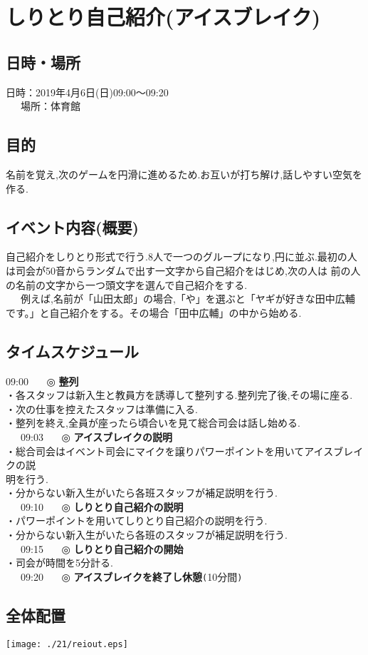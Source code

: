 \section{しりとり自己紹介(アイスブレイク)}
\subsection{日時・場所}
日時：2019年4月6日(日)09:00〜09:20\\
\ \ \ 場所：体育館\\
\subsection{目的}
名前を覚え,次のゲームを円滑に進めるため.お互いが打ち解け,話しやすい空気を作る.
\subsection{イベント内容(概要)}
自己紹介をしりとり形式で行う.8人で一つのグループになり,円に並ぶ.最初の人は司会が50音からランダムで出す一文字から自己紹介をはじめ,次の人は
前の人の名前の文字から一つ頭文字を選んで自己紹介をする.\\
\ \ \ 例えば,名前が「山田太郎」の場合,「や」を選ぶと「ヤギが好きな田中広輔です。」と自己紹介をする。その場合「田中広輔」の中から始める.
\subsection{タイムスケジュール}
09:00 \ \ \ ◎ \textbf{整列} \\
\hspace{15mm}・各スタッフは新入生と教員方を誘導して整列する.整列完了後,その場に座る.\\
\hspace{15mm}・次の仕事を控えたスタッフは準備に入る.\\
\hspace{15mm}・整列を終え,全員が座ったら頃合いを見て総合司会は話し始める.\\
\ \ \ 09:03 \ \ \ ◎ \textbf{アイスブレイクの説明}\\
\hspace{15mm}・総合司会はイベント司会にマイクを譲りパワーポイントを用いてアイスブレイクの説\\
\hspace{15mm}明を行う.\\
\hspace{15mm}・分からない新入生がいたら各班スタッフが補足説明を行う.\\
\ \ \ 09:10 \ \ \ ◎ \textbf{しりとり自己紹介の説明}\\
\hspace{15mm}・パワーポイントを用いてしりとり自己紹介の説明を行う.\\
\hspace{15mm}・分からない新入生がいたら各班のスタッフが補足説明を行う.\\
\ \ \ 09:15 \ \ \ ◎ \textbf{しりとり自己紹介の開始}\\
\hspace{15mm}・司会が時間を5分計る.\\
\ \ \ 09:20 \ \ \ ◎ \textbf{アイスブレイクを終了し休憩}\verb+(+10分間\verb+)+
\subsection{全体配置}
\begin{center}
\texttt{[image: ./21/reiout.eps]}
\end{center}
